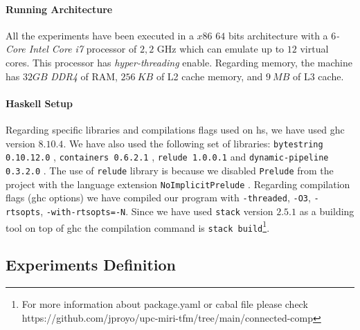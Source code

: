 \paragraph{Running Architecture}
All the experiments have been executed in a $x86$ $64$ bits architecture with a \textit{$6$-Core Intel Core i7} processor of $2,2$ GHz which can emulate up to $12$ virtual cores. This processor has \emph{hyper-threading} enable. Regarding memory, the machine has $32 GB$ \emph{DDR4} of RAM, $256\ KB$ of L2 cache memory, and $9\ MB$ of L3 cache.

\paragraph{Haskell Setup}
Regarding specific libraries and compilations flags used on \acrshort{hs}, we have used \acrshort{ghc} version $8.10.4$. 
We have also used the following set of libraries: \texttt{bytestring 0.10.12.0} \cite{bytestring}, \texttt{containers 0.6.2.1} \cite{containers}, \texttt{relude 1.0.0.1} \cite{relude} and \texttt{dynamic-pipeline 0.3.2.0} \cite{dynamic-pipeline}. 
The use of \texttt{relude} library is because we disabled \texttt{Prelude} from the project with the language extension \texttt{NoImplicitPrelude} \cite{extensions}. 
Regarding compilation flags (\acrshort{ghc} options) we have compiled our program with \texttt{-threaded}, \texttt{-O3}, \texttt{-rtsopts}, \texttt{-with-rtsopts=-N}. 
Since we have used \texttt{stack} version $2.5.1$ \cite{stack} as a building tool on top of \acrshort{ghc} the compilation command is \texttt{stack build}\footnote{For more information about package.yaml or cabal file please check https://github.com/jproyo/upc-miri-tfm/tree/main/connected-comp}.
\fi

\subsection{Experiments Definition}\label{sub:new:exp:def}

